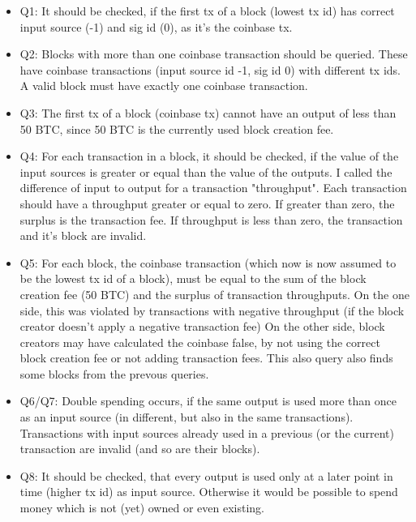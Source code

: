 \documentclass[12pt,a4paper]{article}
\begin{document}
\begin{itemize}


\item Q1: It should be checked, if the first tx of a block (lowest tx id) has correct input source (-1) and sig id (0), as it's the coinbase tx.

\item Q2: Blocks with more than one coinbase transaction should be queried. These have coinbase transactions (input source id -1, sig id 0) with different tx ids.
A valid block must have exactly one coinbase transaction.

\item Q3: The first tx of a block (coinbase tx) cannot have an output of less than 50 BTC, since 50 BTC is the currently used block creation fee.

\item Q4: For each transaction in a block, it should be checked, if the value of the
input sources is greater or equal than the value of the outputs. I called the difference of input to output for a transaction "throughput".
Each transaction should have a throughput greater or equal to zero. If greater than zero, the surplus is the transaction fee.
If throughput is less than zero, the transaction and it's block are invalid.

\item Q5: For each block, the coinbase transaction (which now is now assumed to be the lowest tx id of a block), must be equal to the sum of the block creation fee (50 BTC)
and the surplus of transaction throughputs.\newline
On the one side, this was violated by transactions with negative throughput (if the block creator doesn't apply a negative transaction fee)\newline
On the other side, block creators may have calculated the coinbase false, by not using the correct block creation fee or not adding transaction fees.
This also query also finds some blocks from the prevous queries.

\item Q6/Q7: Double spending occurs, if the same output is used more than once as an input source (in different, but also in the same transactions). Transactions with input sources already
used in a previous (or the current) transaction are invalid (and so are their blocks).

\item Q8: It should be checked, that every output is used only at a later point in time (higher tx id) as input source.
Otherwise it would be possible to spend money which is not (yet) owned or even existing.


\end{itemize}
\end{document}
